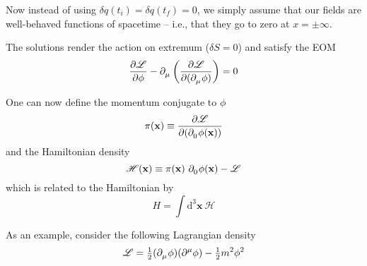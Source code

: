 \documentclass{article}
\begin{document}

\noindent Now instead of using $\delta q (t_i) = \delta q (t_f) = 0$, we simply assume that our fields are well-behaved functions of spacetime -- i.e., that they go to zero at $x = \pm \infty$.

\noindent The solutions render the action on extremum ($\delta S = 0$) and satisfy the EOM
\begin{equation*}
    \dfrac{ \partial \mathscr{L} }{ \partial \phi } - \tensor{\partial}{_\mu} \left( \dfrac{ \partial \mathscr{L} }{ \partial( \tensor{\partial}{_\mu} \phi ) } \right) = 0
\end{equation*}

\noindent One can now define the momentum conjugate to $\phi$
\begin{equation*}
    \pi (\mathbf{x}) \equiv \dfrac{ \partial \mathscr{L} }{ \partial( \tensor{\partial}{_0} \phi (\mathbf{x}) ) }
\end{equation*}
and the Hamiltonian density
\begin{equation*}
    \mathscr{H} (\mathbf{x}) \equiv \pi (\mathbf{x}) ~ \tensor{\partial}{_0} \phi (\mathbf{x}) - \mathscr{L}
\end{equation*}
which is related to the Hamiltonian by
\begin{equation*}
    H = \int \mathrm{d}^3 \mathbf{x}~ \mathscr{H}
\end{equation*}


\noindent As an example, consider the following Lagrangian density
\begin{equation*}
    \mathscr{L} = \tfrac{1}{2} ( \tensor{\partial}{_\mu} \phi ) ( \tensor{\partial}{^\mu} \phi ) - \tfrac{1}{2} m^2 \phi^2
\end{equation*}
\end{document}
